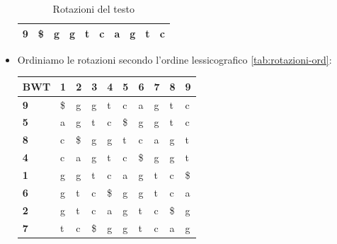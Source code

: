\begin{esempio}
\begin{itemize}
\begin{table}[!ht]
\begin{tabular}{|
                          >{\columncolor[HTML]{EFEFEF}}l |lllllllll|}
                      \textbf{9}                         & \$ & g  & g  & t  & c  & a  & g  & t  & c  \\ \hline
                  \end{tabular}
                  \caption{Rotazioni del testo}
                  \label{tab:rotazioni}
              \end{table}
        \item Ordiniamo le rotazioni secondo l'ordine lessicografico \ref{tab:rotazioni-ord}:
              \begin{table}[!ht]
                  \centering
                  \begin{tabular}{|
                          >{\columncolor[HTML]{EFEFEF}}l |l|l|l|l|l|l|l|l|l|}
                      \hline
                      \textbf{BWT}                       &
                      \cellcolor[HTML]{EFEFEF}\textbf{1} &
                      \cellcolor[HTML]{EFEFEF}\textbf{2} &
                      \cellcolor[HTML]{EFEFEF}\textbf{3} &
                      \cellcolor[HTML]{EFEFEF}\textbf{4} &
                      \cellcolor[HTML]{EFEFEF}\textbf{5} &
                      \cellcolor[HTML]{EFEFEF}\textbf{6} &
                      \cellcolor[HTML]{EFEFEF}\textbf{7} &
                      \cellcolor[HTML]{EFEFEF}\textbf{8} &
                      \cellcolor[HTML]{EFEFEF}\textbf{9}                                              \\ \hline
                      \textbf{9}                         & \$ & g  & g  & t  & c  & a  & g  & t  & c  \\ \hline
                      \textbf{5}                         & a  & g  & t  & c  & \$ & g  & g  & t  & c  \\ \hline
                      \textbf{8}                         & c  & \$ & g  & g  & t  & c  & a  & g  & t  \\ \hline
                      \textbf{4}                         & c  & a  & g  & t  & c  & \$ & g  & g  & t  \\ \hline
                      \textbf{1}                         & g  & g  & t  & c  & a  & g  & t  & c  & \$ \\ \hline
                      \textbf{6}                         & g  & t  & c  & \$ & g  & g  & t  & c  & a  \\ \hline
                      \textbf{2}                         & g  & t  & c  & a  & g  & t  & c  & \$ & g  \\ \hline
                      \textbf{7}                         & t  & c  & \$ & g  & g  & t  & c  & a  & g  \\ \hline

\end{tabular}
\end{table}
\end{itemize}
\end{esempio}
